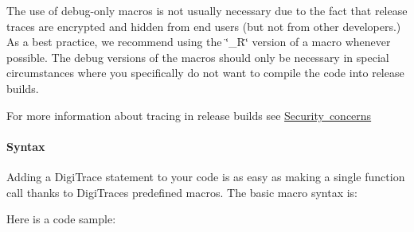  The use of debug-\/only macros is not usually necessary due to the fact that release traces are encrypted and hidden from end users (but not from other developers.) As a best practice, we recommend using the \char`\"{}\+\_\+\+R\char`\"{} version of a macro whenever possible. The debug versions of the macros should only be necessary in special circumstances where you specifically do not want to compile the code into release builds.

 For more information about tracing in release builds see \mbox{\hyperlink{a00834_digitrace__tracingfromplugins__security}{Security concerns}}

\hypertarget{a00834_digitrace__advancedlogging__macros__syntax}{}\paragraph{Syntax}\label{a00834_digitrace__advancedlogging__macros__syntax}
 Adding a Digi\+Trace statement to your code is as easy as making a single function call thanks to Digi\+Trace\textquotesingle{}s predefined macros. The basic macro syntax is\+:


\begin{DoxyCode}{0}
\end{DoxyCode}


 Here is a code sample\+:


\begin{DoxyCode}{0}
\DoxyCodeLine{\{}
\DoxyCodeLine{     \textcolor{comment}{// You need only to specify a trace facility.}}
\DoxyCodeLine{}
\DoxyCodeLine{     \{}
\DoxyCodeLine{     \}}
\DoxyCodeLine{     \textcolor{keywordflow}{else}}
\DoxyCodeLine{     \{}
\DoxyCodeLine{     \}}
\DoxyCodeLine{\}}
\end{DoxyCode}


